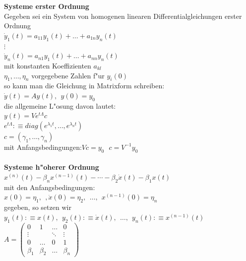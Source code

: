 \documentclass[10pt, a4paper, twocolumn]{scrartcl}
\begin{document}
{\bf Systeme erster Ordnung}\\

Gegeben sei ein System von homogenen linearen Differentialgleichungen erster Ordnung\\
$\dot{y}_1(t)= a_{11}y_1(t) + \ldots + a_{1n}y_n(t)$\\
$\vdots$\\
$\dot{y}_n(t)= a_{n1}y_1(t) + \ldots + a_{nn}y_n(t)$\\
mit konstanten Koeffizienten $a_{kl}$\\
$\eta_1,\ldots,\eta_n$ vorgegebene Zahlen f"ur $y_i(0)$\\
so kann man die Gleichung in Matrixform schreiben:\\
$\dot{y}(t)=Ay(t),\:\:y(0)=y_0$\\
die allgemeine L"osung davon lautet:\\
$y(t)=V e^{t\Lambda}c$\\
$e^{t\Lambda}:\equiv diag(e^{\lambda_1 t},\ldots,e^{\lambda_n t})$\\
$c=(\gamma_1,\ldots,\gamma_n)$\\
mit Anfangsbedingungen:$Vc=y_0\:\:\:c=V^{-1}y_0$\\\\


{\bf Systeme h"oherer Ordnung}\\
$x^{(n)}(t)-\beta_nx^{(n-1)}(t)-\cdots-\beta_2\dot{x}(t)-\beta_1x(t)$\\
mit den Anfangsbedingungen:\\
$x(0)=\eta_1,\:\:,\dot{x}(0)=\eta_2,\:\:\ldots,\:\:x^{(n-1)}(0)=\eta_n$\\
gegeben, so setzen wir\\
$y_1(t):\equiv x(t),\:\:y_2(t):\equiv\dot{x}(t),\:\:\ldots,\:\: y_n(t):\equiv x^{(n-1)}(t)$\\

$A=
\left ( 
\begin{array}{cccc}
0 & 1 & \ldots & 0 \\
\vdots &  & \ddots & \vdots \\
0 & \ldots & 0 & 1 \\
\beta_1 & \beta_2 &\ldots & \beta_n
\end{array}
\right )
$\\\\
\end{document}
